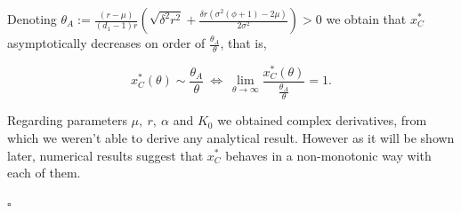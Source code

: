 

Denoting $\theta_A:=\frac{(r-\mu )}{(d_1-1) r}  \left(\sqrt{\delta ^2 r^2}+\frac{\delta  r \left(\sigma ^2 (\phi +1)-2 \mu \right)}{2 \sigma ^2}\right)>0$ we obtain that $x^*_C$ asymptotically decreases on order of $\frac{\theta_A}{\theta}$, that is,  

$$x^*_C(\theta) \sim \frac{\theta_A}{\theta} \ \Leftrightarrow \ \lim_{\theta \to \infty} \frac{x^*_C(\theta)}{\frac{\theta_A}{\theta}}=1.$$

Regarding parameters $\mu, \ r, \ \alpha$ and $K_0$ we obtained complex derivatives, from which we weren't able to derive any analytical result. However as it will be shown later, numerical results suggest that $x_C^*$ behaves in a non-monotonic way with each of them.

\begin{flushright}
	$\square$
\end{flushright}



